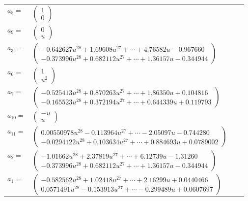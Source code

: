 \documentclass[1p]{elsarticle_modified}
\theoremstyle{definition}
\begin{document}
\begin{tabular}{m{7pt} m{180pt} m{7pt} m{180pt} }
\flushright $a_{5}=$&$\begin{pmatrix}1\\0\end{pmatrix}$ \\
\flushright $a_{9}=$&$\begin{pmatrix}0\\u\end{pmatrix}$ \\
\flushright $a_{3}=$&$\begin{pmatrix}-0.642627 u^{28}+1.69608 u^{27}+\cdots+4.76582 u-0.967660\\-0.373996 u^{28}+0.682112 u^{27}+\cdots+1.36157 u-0.344944\end{pmatrix}$ \\
\flushright $a_{6}=$&$\begin{pmatrix}1\\u^2\end{pmatrix}$ \\
\flushright $a_{7}=$&$\begin{pmatrix}-0.525413 u^{28}+0.870263 u^{27}+\cdots+1.86350 u+0.104816\\-0.165523 u^{28}+0.372194 u^{27}+\cdots+0.644339 u+0.119793\end{pmatrix}$ \\
\flushright $a_{10}=$&$\begin{pmatrix}- u\\u\end{pmatrix}$ \\
\flushright $a_{11}=$&$\begin{pmatrix}0.00550978 u^{28}-0.113964 u^{27}+\cdots-2.05097 u-0.744280\\-0.0294122 u^{28}+0.103634 u^{27}+\cdots+0.884693 u+0.0789002\end{pmatrix}$ \\
\flushright $a_{2}=$&$\begin{pmatrix}-1.01662 u^{28}+2.37819 u^{27}+\cdots+6.12739 u-1.31260\\-0.373996 u^{28}+0.682112 u^{27}+\cdots+1.36157 u-0.344944\end{pmatrix}$ \\
\flushright $a_{1}=$&$\begin{pmatrix}-0.582562 u^{28}+1.02418 u^{27}+\cdots+2.16299 u+0.0440466\\0.0571491 u^{28}-0.153913 u^{27}+\cdots-0.299489 u+0.0607697\end{pmatrix}$ \\

\end{tabular}
\end{document}
